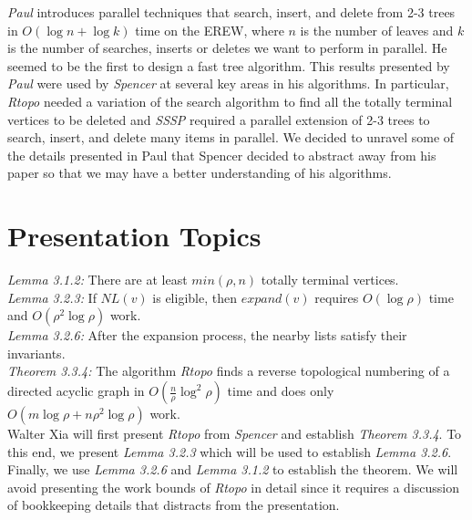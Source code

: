 \documentclass[paper=a4, fontsize=11pt]{scrartcl} %
\numberwithin{equation}{section} %
\numberwithin{figure}{section} %
\numberwithin{table}{section} %
\begin{document}
\textit{Paul\cite{P83}} introduces parallel techniques that search, insert, and delete from 2-3 trees in $O(\log{n} + \log{k})$ time on the EREW, where $n$ is the number of leaves and $k$ is the number of searches, inserts or deletes we want to perform in parallel. He seemed to be the first to design a fast tree algorithm. This results presented by \textit{Paul\cite{P83}} were used by \textit{Spencer\cite{S97}} at several key areas in his algorithms. In particular, \textit{Rtopo} needed a variation of the search algorithm to find all the totally terminal vertices to be deleted and \textit{SSSP} required a parallel extension of 2-3 trees to search, insert, and delete many items in parallel. We decided to unravel some of the details presented in Paul that Spencer decided to abstract away from his paper so that we may have a better understanding of his algorithms.



\section{Presentation Topics}
\hfill

\textit{Lemma 3.1.2:} There are at least $min(\rho,n)$ totally terminal vertices.\\

\textit{Lemma 3.2.3:} If $NL(v)$ is eligible, then $expand(v)$ requires $O(\log{\rho})$ time and $O(\rho^2\log{\rho})$ work.\\

\textit{Lemma 3.2.6:} After the expansion process, the nearby lists satisfy their invariants.\\

\textit{Theorem 3.3.4:} The algorithm \textit{Rtopo} finds a reverse topological numbering of a directed acyclic graph in $O(\frac{n}{\rho}\log^2{\rho})$ time and does only $O(m\log{\rho} + n\rho^2\log{\rho})$ work.\\

Walter Xia will first present \textit{Rtopo} from \textit{Spencer\cite{S97}} and establish \textit{Theorem 3.3.4}. To this end, we present \textit{Lemma 3.2.3} which will be used to establish \textit{Lemma 3.2.6}. Finally, we use \textit{Lemma 3.2.6} and \textit{Lemma 3.1.2} to establish the theorem. We will avoid presenting the work bounds of \textit{Rtopo} in detail since it requires a discussion of bookkeeping details that distracts from the presentation.\\
\end{document}
